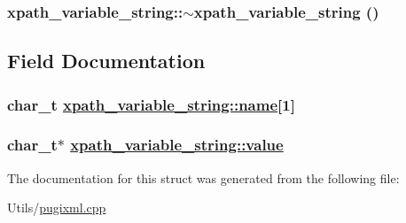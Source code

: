 \hypertarget{structxpath__variable__string_8e5e421f2e963e6196d2812a623ee912}{
\subsubsection[$\sim$xpath\_\-variable\_\-string]{\setlength{\rightskip}{0pt plus 5cm}xpath\_\-variable\_\-string::$\sim$xpath\_\-variable\_\-string ()}}
\label{structxpath__variable__string_8e5e421f2e963e6196d2812a623ee912}




\subsection{Field Documentation}
\hypertarget{structxpath__variable__string_5c43cdcc55a620db0e7bdd29b4d56e89}{
\subsubsection[name]{\setlength{\rightskip}{0pt plus 5cm}char\_\-t \hyperlink{structxpath__variable__string_5c43cdcc55a620db0e7bdd29b4d56e89}{xpath\_\-variable\_\-string::name}\mbox{[}1\mbox{]}}}
\label{structxpath__variable__string_5c43cdcc55a620db0e7bdd29b4d56e89}


\hypertarget{structxpath__variable__string_eb8a87a8457d2615cd7b766fd3f30559}{
\subsubsection[value]{\setlength{\rightskip}{0pt plus 5cm}char\_\-t$\ast$ \hyperlink{structxpath__variable__string_eb8a87a8457d2615cd7b766fd3f30559}{xpath\_\-variable\_\-string::value}}}
\label{structxpath__variable__string_eb8a87a8457d2615cd7b766fd3f30559}




The documentation for this struct was generated from the following file:\begin{CompactItemize}
\item 
Utils/\hyperlink{pugixml_8cpp}{pugixml.cpp}\end{CompactItemize}
